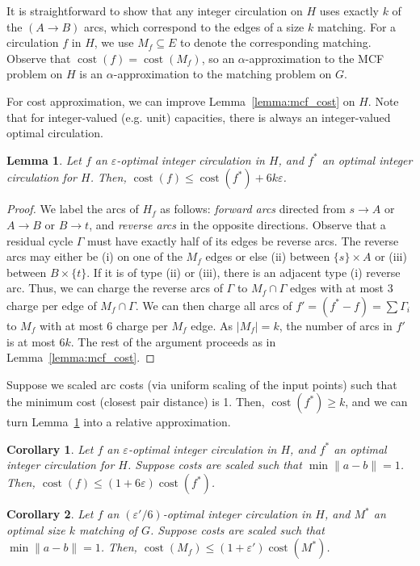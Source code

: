 \documentclass[11pt]{article}
\def\eps{\varepsilon}
\theoremstyle{plain}
\newtheorem{lemma}{Lemma}
\newtheorem{corollary}{Corollary}
\def\cost{\operatorname{cost}}
\begin{document}
\begin{figure*}
It is straightforward to show that any integer circulation on $H$ uses exactly
$k$ of the $(A \to B)$ arcs, which correspond to the edges of a size $k$
matching.
For a circulation $f$ in $H$, we use $M_f \subseteq E$ to denote the
corresponding matching.
Observe that $\cost(f) = \cost(M_f)$, so an $\alpha$-approximation to the MCF
problem on $H$ is an $\alpha$-approximation to the matching problem on $G$.

For cost approximation, we can improve Lemma~\ref{lemma:mcf_cost} on $H$.
Note that for integer-valued (e.g. unit) capacities, there is always an
integer-valued optimal circulation.
\begin{lemma}
\label{lemma:goldberg_cost_add}
	Let $f$ an $\eps$-optimal integer circulation in $H$, and $f^*$ an
	optimal integer circulation for $H$.
	Then, $\cost(f) \leq \cost(f^*) + 6k\eps$.
\end{lemma}
\begin{proof}
	We label the arcs of $H_f$ as follows: \emph{forward arcs} directed
	from $s \to A$ or $A \to B$ or $B \to t$, and \emph{reverse arcs} in
	the opposite directions.
	Observe that a residual cycle $\Gamma$ must have exactly half of its
	edges be reverse arcs.
	The reverse arcs may either be (i) on one of the $M_f$ edges or else
	(ii) between $\{s\} \times A$ or (iii) between $B \times \{t\}$.
	If it is of type (ii) or (iii), there is an adjacent type (i) reverse
	arc.
	Thus, we can charge the reverse arcs of $\Gamma$ to $M_f \cap \Gamma$
	edges with at most 3 charge per edge of $M_f \cap \Gamma$.
	We can then charge all arcs of $f' = (f^* - f) = \sum \Gamma_i$ to
	$M_f$ with at most 6 charge per $M_f$ edge.
	As $|M_f| = k$, the number of arcs in $f'$ is at most $6k$.
	The rest of the argument proceeds as in Lemma~\ref{lemma:mcf_cost}.
\end{proof}

Suppose we scaled arc costs (via uniform scaling of the input points) such that
the minimum cost (closest pair distance) is 1.
Then, $\cost(f^*) \geq k$, and we can turn Lemma~\ref{lemma:goldberg_cost_add}
into a relative approximation.

\begin{corollary}
\label{corollary:flow_approx}
	Let $f$ an $\eps$-optimal integer circulation in $H$, and $f^*$ an
	optimal integer circulation for $H$.
	Suppose costs are scaled such that $\min \|a - b\| = 1$.
	Then, $\cost(f) \leq (1 + 6\eps) \cost(f^*)$.
\end{corollary}

\begin{corollary}
\label{corollary:match_approx}
	Let $f$ an $(\eps'/6)$-optimal integer circulation in $H$, and $M^*$ an
	optimal size $k$ matching of $G$.
	Suppose costs are scaled such that $\min \|a - b\| = 1$.
	Then, $\cost(M_f) \leq (1 + \eps') \cost(M^*)$.
\end{corollary}


\end{figure*}
\end{document}
